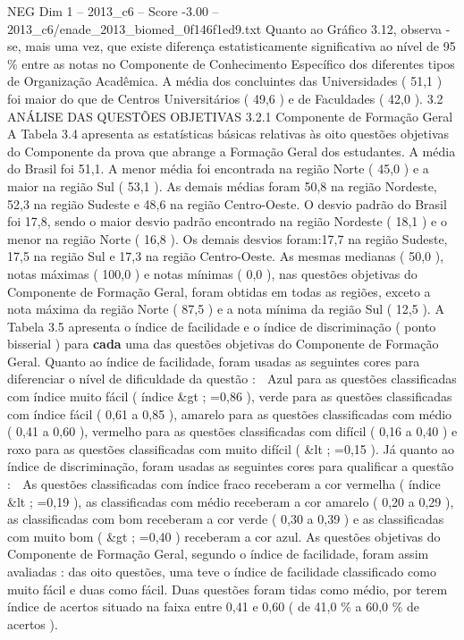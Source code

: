 \begin{textsample}{NEG Dim 1 – 2013\_c6 – Score -3.00 – 2013\_c6/enade\_2013\_biomed\_0f146f1ed9.txt}
Quanto ao Gráfico 3.12, observa -se, mais uma vez, que existe diferença estatisticamente significativa ao nível de 95 \% entre as notas no Componente de Conhecimento Específico dos diferentes tipos de Organização Acadêmica.
A média dos concluintes das Universidades ( 51,1 ) foi maior do que de Centros Universitários ( 49,6 ) e de Faculdades ( 42,0 ). 3.2 ANÁLISE DAS QUESTÕES OBJETIVAS 3.2.1 Componente de Formação Geral A Tabela 3.4 apresenta as estatísticas básicas relativas às oito questões objetivas do Componente da prova que abrange a Formação Geral dos estudantes.
A média do Brasil foi 51,1.
A menor média foi encontrada na região Norte ( 45,0 ) e a maior na região Sul ( 53,1 ).
As demais médias foram 50,8 na região Nordeste, 52,3 na região Sudeste e 48,6 na região Centro-Oeste.
O desvio padrão do Brasil foi 17,8, sendo o maior desvio padrão encontrado na região Nordeste ( 18,1 ) e o menor na região Norte ( 16,8 ).
Os demais desvios foram:17,7 na região Sudeste, 17,5 na região Sul e 17,3 na região Centro-Oeste.
As mesmas medianas ( 50,0 ), notas máximas ( 100,0 ) e notas mínimas ( 0,0 ), nas questões objetivas do Componente de Formação Geral, foram obtidas em todas as regiões, exceto a nota máxima da região Norte ( 87,5 ) e a nota mínima da região Sul ( 12,5 ).
A Tabela 3.5 apresenta o índice de facilidade e o índice de discriminação ( ponto bisserial ) para \textbf{cada} uma das questões objetivas do Componente de Formação Geral.
Quanto ao índice de facilidade, foram usadas as seguintes cores para diferenciar o nível de dificuldade da questão :  Azul para as questões classificadas com índice muito fácil ( índice \&gt ; =0,86 ), verde para as questões classificadas com índice fácil ( 0,61 a 0,85 ), amarelo para as questões classificadas com médio ( 0,41 a 0,60 ), vermelho para as questões classificadas com difícil ( 0,16 a 0,40 ) e roxo para as questões classificadas com muito difícil ( \&lt ; =0,15 ).
Já quanto ao índice de discriminação, foram usadas as seguintes cores para qualificar a questão :  As questões classificadas com índice fraco receberam a cor vermelha ( índice \&lt ; =0,19 ), as classificadas com médio receberam a cor amarelo ( 0,20 a 0,29 ), as classificadas com bom receberam a cor verde ( 0,30 a 0,39 ) e as classificadas com muito bom ( \&gt ; =0,40 ) receberam a cor azul.
As questões objetivas do Componente de Formação Geral, segundo o índice de facilidade, foram assim avaliadas : das oito questões, uma teve o índice de facilidade classificado como muito fácil e duas como fácil.
Duas questões foram tidas como médio, por terem índice de acertos situado na faixa entre 0,41 e 0,60 ( de 41,0 \% a 60,0 \% de acertos ).

\end{textsample}
